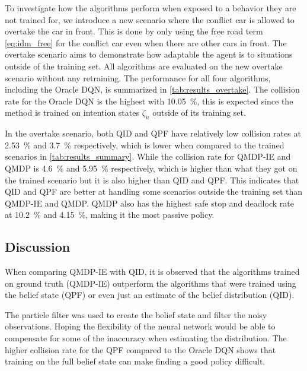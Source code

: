 To investigate how the algorithms perform when exposed to a behavior they are not trained for, we introduce a new scenario where the conflict car is allowed to overtake the car in front. This is done by only using the free road term \eqref{eq:idm_free} for the conflict car even when there are other cars in front. The overtake scenario aims to demonstrate how adaptable the agent is to situations outside of the training set.
All algorithms are evaluated on the new overtake scenario without any retraining. 
The performance for all four algorithms, including the Oracle DQN, is summarized in \ref{tab:results_overtake}. 
The collision rate for the Oracle DQN is the highest with \SI{10.05}{\percent}, this is expected since the method is trained on intention states $\zeta_n$ outside of its training set. 

In the overtake scenario, both QID and QPF have relatively low collision rates at \SI{2.53}{\percent} and \SI{3.7}{\percent} respectively, which is lower when compared to the trained scenarios in \ref{tab:results_summary}. 
While the collision rate for QMDP-IE and QMDP is \SI{4.6}{\percent} and \SI{5.95}{\percent} respectively, which is higher than what they got on the trained scenario but it is also higher than QID and QPF. This indicates that QID and QPF are better at handling some scenarios outside the training set than QMDP-IE and QMDP.
QMDP also has the highest safe stop and deadlock rate at \SI{10.2}{\percent} and \SI{4.15}{\percent}, making it the most passive policy. 

\subsection{Discussion}
\label{sec:discussion}

When comparing QMDP-IE with QID, it is observed that the algorithms trained on ground truth (QMDP-IE) outperform the algorithms that were trained using the belief state (QPF) or even just an estimate of the belief distribution (QID).  

The particle filter was used to create the belief state and filter the noisy observations. Hoping the flexibility of the neural network would be able to compensate for some of the inaccuracy when estimating the distribution. The higher collision rate for the QPF compared to the Oracle DQN shows that training on the full belief state can make finding a good policy difficult. 

